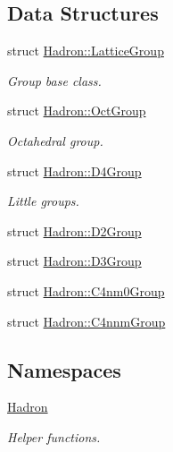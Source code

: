 \subsection*{Data Structures}
\begin{DoxyCompactItemize}
\item 
struct \mbox{\hyperlink{structHadron_1_1LatticeGroup}{Hadron\+::\+Lattice\+Group}}
\begin{DoxyCompactList}\small\item\em Group base class. \end{DoxyCompactList}\item 
struct \mbox{\hyperlink{structHadron_1_1OctGroup}{Hadron\+::\+Oct\+Group}}
\begin{DoxyCompactList}\small\item\em Octahedral group. \end{DoxyCompactList}\item 
struct \mbox{\hyperlink{structHadron_1_1D4Group}{Hadron\+::\+D4\+Group}}
\begin{DoxyCompactList}\small\item\em Little groups. \end{DoxyCompactList}\item 
struct \mbox{\hyperlink{structHadron_1_1D2Group}{Hadron\+::\+D2\+Group}}
\item 
struct \mbox{\hyperlink{structHadron_1_1D3Group}{Hadron\+::\+D3\+Group}}
\item 
struct \mbox{\hyperlink{structHadron_1_1C4nm0Group}{Hadron\+::\+C4nm0\+Group}}
\item 
struct \mbox{\hyperlink{structHadron_1_1C4nnmGroup}{Hadron\+::\+C4nnm\+Group}}
\end{DoxyCompactItemize}
\subsection*{Namespaces}
\begin{DoxyCompactItemize}
\item 
 \mbox{\hyperlink{namespaceHadron}{Hadron}}
\begin{DoxyCompactList}\small\item\em Helper functions. \end{DoxyCompactList}\end{DoxyCompactItemize}
